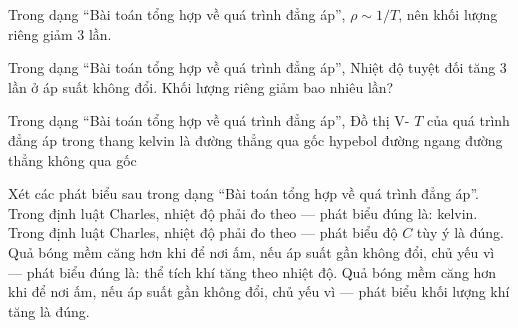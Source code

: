 \begin{bt}
Trong dạng “Bài toán tổng hợp về quá trình đẳng áp”, $\rho\sim1/T$, nên khối lượng riêng giảm 3 lần.
\end{bt}

\begin{ex}
Trong dạng “Bài toán tổng hợp về quá trình đẳng áp”, Nhiệt độ tuyệt đối tăng 3 lần ở áp suất không đổi. Khối lượng riêng giảm bao nhiêu lần?
\end{ex}

\begin{ex}
Trong dạng “Bài toán tổng hợp về quá trình đẳng áp”, Đồ thị V- $T$ của quá trình đẳng áp trong thang kelvin là
\choice
{\True đường thẳng qua gốc}
{hypebol}
{đường ngang}
{đường thẳng không qua gốc}
\end{ex}

\begin{ex}
Xét các phát biểu sau trong dạng “Bài toán tổng hợp về quá trình đẳng áp”.
\choiceTF
{\True Trong định luật Charles, nhiệt độ phải đo theo — phát biểu đúng là: kelvin.}
{Trong định luật Charles, nhiệt độ phải đo theo — phát biểu độ $C$ tùy ý là đúng.}
{\True Quả bóng mềm căng hơn khi để nơi ấm, nếu áp suất gần không đổi, chủ yếu vì — phát biểu đúng là: thể tích khí tăng theo nhiệt độ.}
{Quả bóng mềm căng hơn khi để nơi ấm, nếu áp suất gần không đổi, chủ yếu vì — phát biểu khối lượng khí tăng là đúng.}
\end{ex}

